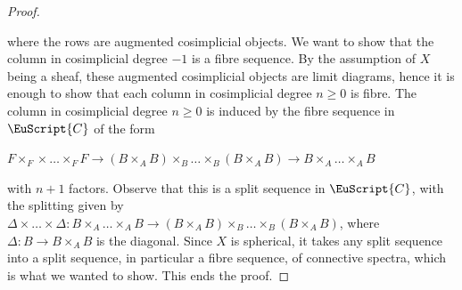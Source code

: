 \documentclass[oneside,a4paper]{amsart}
\newcommand{\euscr}[1]{\EuScript{#1}} %
\newcommand{\ccat}{\euscr{C}} %
\newcommand{\triplerightarrow}{%
\tikz[minimum height=0ex]
  \path[->]
   node (a)            {}
   node (b) at (1em,0) {}
  (a.north)  edge (b.north)
  (a.center) edge (b.center)
  (a.south)  edge (b.south);%
}
\theoremstyle{plain}
\theoremstyle{definition}
\theoremstyle{remark}
\begin{document}
\begin{proof}
\begin{center}
\end{center}
where the rows are augmented cosimplicial objects. We want to show that the column in cosimplicial degree $-1$ is a fibre sequence. By the assumption of $X$ being a sheaf, these augmented cosimplicial objects are limit diagrams, hence it is enough to show that each column in cosimplicial degree $n \geq 0$ is fibre. The column in cosimplicial degree $n \geq 0$ is induced by the fibre sequence in $\ccat$ of the form 

\begin{center}
$F \times _{F} \times \ldots \times _{F} F \rightarrow (B \times _{A} B) \times _{B} \ldots \times _{B} (B \times _{A} B) \rightarrow B \times _{A} \ldots \times _{A} B$
\end{center}
with $n + 1$ factors. Observe that this is a split sequence in $\ccat$, with the splitting given by $\Delta \times \ldots \times \Delta \colon B \times _{A} \ldots \times _{A} B \rightarrow (B \times _{A} B) \times _{B} \ldots \times _{B} (B \times _{A} B)$, where $\Delta \colon B \rightarrow B \times _{A} B$ is the diagonal. Since $X$ is spherical, it takes any split sequence into a split sequence, in particular a fibre sequence, of connective spectra, which is what we wanted to show. This ends the proof. 
\end{proof}
\end{document}
